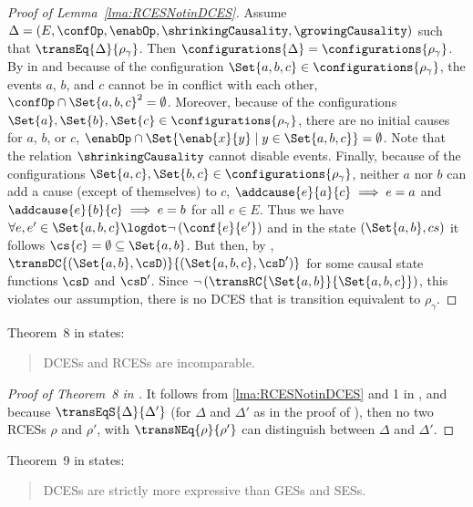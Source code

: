 \documentclass[runningheads,a4paper]{llncs}
\begin{document}
\begin{proof}[Proof of Lemma~\ref{lma:RCESNotinDCES}]
Assume $ \Delta = \left( E, \confOp, \enabOp,\shrinkingCausality, \growingCausality \right) $ such that $ \transEq{\Delta}{\rho_{\gamma}} $. Then $ \configurations{\Delta} = \configurations{\rho_{\gamma}} $.
	By  in \cite{dynamicCausality15} and because of the configuration $ \Set{
	a, b, c } \in \configurations{\rho_{\gamma}} $, the events $ a $, $ b $, and $
	c $ cannot be in conflict with each other, \ie $ \confOp \cap \Set{ a, b, c }^2
	= \emptyset $.
	Moreover, because of the configurations $ \Set{ a }, \Set{ b }, \Set{ c } \in \configurations{\rho_{\gamma}} $, there are no initial causes for $ a $, $ b $, or $ c $, \ie $ \enabOp \cap \Set{ \enab{x}{y} \mid y \in \Set{ a, b, c } } = \emptyset $. Note that the relation $\shrinkingCausality$ cannot disable events.
	Finally, because of the configurations $ \Set{ a, c }, \Set{ b, c } \in \configurations{\rho_{\gamma}} $, neither $ a $ nor $ b $ can add a cause (except of themselves) to $ c $, \ie $ \addcause{e}{a}{c} \implies e = a $ and $ \addcause{e}{b}{c} \implies e = b $ for all $ e \in E $.
	Thus we have $ \forall e, e' \in \Set{ a, b, c } \logdot \neg \left( \conf{e}{e'} \right) $ and in the state $(\Set{a,b}, cs)$ it follows $ \cs{c} = \emptyset \subseteq \Set{ a, b } $.
	But then, by , $ \transDC{(\Set{ a, b },\csD)}{(\Set{ a, b, c },\csD')} $ for some causal state functions $\csD$ and $\csD'$.
	Since $ \neg \left( \transRC{\Set{ a, b }}{\Set{ a, b, c }} \right) $, this violates our assumption, \ie there is no DCES that is transition equivalent to $ \rho_{\gamma} $.
\end{proof}

Theorem~8 in \cite{dynamicCausality15} states:
\begin{quote}
DCESs and RCESs are incomparable.
\end{quote}

\begin{proof}[Proof of Theorem~8 in \cite{dynamicCausality15}]
It follows from \lems\ref{lma:RCESNotinDCES} and 1 in \cite{dynamicCausality15}, and because $\transEqS{\Delta}{\Delta'}$ (for $\Delta$ and $\Delta'$ as in the proof of ), then no two RCESs $\rho$ and $\rho'$, with $\transNEq{\rho}{\rho'}$ can distinguish between $\Delta$ and $\Delta'$.
\end{proof}

Theorem~9 in \cite{dynamicCausality15} states:
\begin{quote}
DCESs are strictly more expressive than GESs and SESs.
\end{quote}
\end{document}
